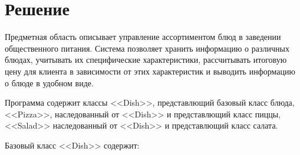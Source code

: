 \documentclass[a4paper,14pt]{extarticle}
\begin{document}
\section*{\hspace{12.5mm}Решение}
Предметная область описывает управление ассортиментом блюд в заведении общественного питания. Система позволяет хранить информацию о различных блюдах, учитывать их специфические характеристики, рассчитывать итоговую цену для клиента в зависимости от этих характеристик и выводить информацию о блюде в удобном виде.

Программа содержит классы <<Dish>>, представлющий базовый класс блюда,  <<Pizza>>, наследованный от <<Dish>> и представлющий класс пиццы, <<Salad>> наследованный от <<Dish>> и представлющий класс салата.

Базовый класс <<Dish>> содержит:
\end{document}

